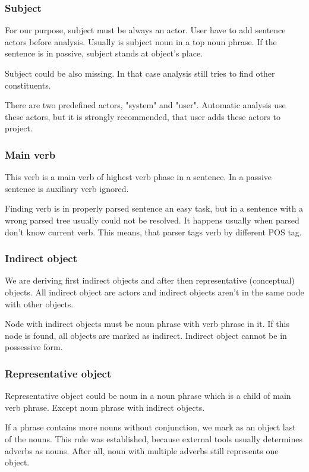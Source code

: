 \subsubsection{Subject}
For our purpose, subject must be always an actor. User have to add sentence actors before analysis. Usually is subject noun in a top noun phrase. If the sentence is in passive, subject stands at object's place. 

Subject could be also missing. In that case analysis still tries to find other constituents.

There are two predefined actors, "system" and "user". Automatic analysis use these actors, but it is strongly recommended, that user adds these actors to project.

\subsubsection{Main verb}
This verb is a main verb of highest verb phase in a sentence. In a passive sentence is auxiliary verb ignored. 

Finding verb is in properly parsed sentence an easy task, but in a sentence with a wrong parsed tree usually could not be resolved. It happens usually when parsed don't know current verb. This means, that parser tags verb by different POS tag.

\subsubsection{Indirect object}
We are deriving first indirect objects and after then representative (conceptual) objects. All indirect object are actors and indirect objects aren't in the same node with other objects.

Node with indirect objects must be noun phrase with verb phrase in it. If this node is found, all objects are marked as indirect. Indirect object cannot be in possessive form.  

\subsubsection{Representative object}
Representative object could be noun in a noun phrase which is a child of main verb phrase. Except noun phrase with indirect objects.

If a phrase contains more nouns without conjunction, we mark as an object last of the nouns. This rule was established, because external tools usually determines adverbs as nouns. After all, noun with multiple adverbs still represents one object.

